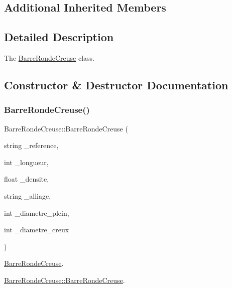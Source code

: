\subsection*{Additional Inherited Members}


\subsection{Detailed Description}
The \hyperlink{class_barre_ronde_creuse}{Barre\+Ronde\+Creuse} class. 

\subsection{Constructor \& Destructor Documentation}
\mbox{\label{class_barre_ronde_creuse_ad0900f47420c5f5d722bc97af6b5ffd7}} 
\subsubsection{\texorpdfstring{Barre\+Ronde\+Creuse()}{BarreRondeCreuse()}}
{\footnotesize\ttfamily Barre\+Ronde\+Creuse\+::\+Barre\+Ronde\+Creuse (\begin{DoxyParamCaption}\item[{string}]{\+\_\+reference,  }\item[{int}]{\+\_\+longueur,  }\item[{float}]{\+\_\+densite,  }\item[{string}]{\+\_\+alliage,  }\item[{int}]{\+\_\+diametre\+\_\+plein,  }\item[{int}]{\+\_\+diametre\+\_\+creux }\end{DoxyParamCaption})}



\hyperlink{class_barre_ronde_creuse}{Barre\+Ronde\+Creuse}. 

\hyperlink{class_barre_ronde_creuse_ad0900f47420c5f5d722bc97af6b5ffd7}{Barre\+Ronde\+Creuse\+::\+Barre\+Ronde\+Creuse}.


